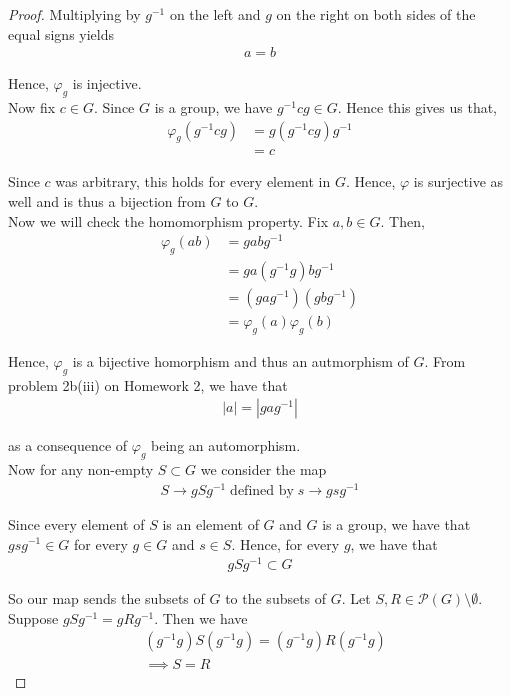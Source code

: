 \documentclass[11pt, reqno]{amsart}
\theoremstyle{plain}
\theoremstyle{definition}
\theoremstyle{example}
\begin{document}
\begin{enumerate}[1.]
\begin{enumerate}[(a)]
\begin{proof}
Multiplying by $g^{-1}$ on the left and $g$ on the right on both sides of the equal signs yields
\begin{align*}
a = b
\end{align*}

Hence, $\varphi_g$ is injective.\\

Now fix $c \in G$. Since $G$ is a group, we have $g^{-1}cg \in G$. Hence this gives us that,
\begin{align*}
\varphi_g(g^{-1}cg) &= g(g^{-1}cg)g^{-1}\\
&= c
\end{align*}

Since $c$ was arbitrary, this holds for every element in $G$. Hence, $\varphi$ is surjective as well and is thus a bijection from $G$ to $G$.\\

Now we will check the homomorphism property. Fix $a, b \in G$. Then,
\begin{align*}
\varphi_g(ab) &= gabg^{-1}\\
&= ga(g^{-1}g)bg^{-1}\\
&= (gag^{-1})(gbg^{-1})\\
&= \varphi_g(a)\varphi_g(b)
\end{align*}

Hence, $\varphi_g$ is a bijective homorphism and thus an autmorphism of $G$. From problem 2b(iii) on Homework 2, we have that 
\begin{align*}
|a| = |gag^{-1}|
\end{align*}

as a consequence of $\varphi_g$ being an automorphism.\\

Now for any non-empty $S \subset G$ we consider the map
\begin{align*}
S \to gSg^{-1} \; \text{defined by} \; s \to gsg^{-1}
\end{align*}

Since every element of $S$ is an element of $G$ and $G$ is a group, we have that $gsg^{-1} \in G$ for every $g \in G$ and $s \in S$. Hence, for every $g$, we have that
\begin{align*}
gSg^{-1} \subset G
\end{align*}

So our map sends the subsets of $G$ to the subsets of $G$. Let $S, R \in \mathcal{P}(G) \setminus \emptyset$. Suppose $gSg^{-1} = gRg^{-1}$. Then we have
\begin{align*}
&(g^{-1}g)S(g^{-1}g) = (g^{-1}g)R(g^{-1}g)\\
&\implies S = R
\end{align*}


\end{proof}
\end{enumerate}
\end{enumerate}
\end{document}
